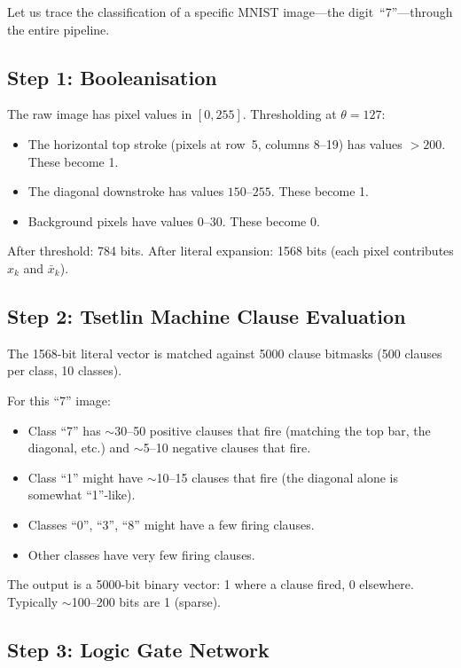 Let us trace the classification of a specific MNIST image---the
digit~``7''---through the entire pipeline.

\subsection{Step 1: Booleanisation}

The raw image has pixel values in $[0, 255]$. Thresholding at
$\theta = 127$:

\begin{itemize}
  \item The horizontal top stroke (pixels at row~5, columns 8--19)
    has values $> 200$. These become 1.
  \item The diagonal downstroke has values $150$--$255$. These
    become 1.
  \item Background pixels have values $0$--$30$. These become 0.
\end{itemize}

After threshold: 784 bits. After literal expansion: 1568 bits (each
pixel contributes $x_k$ and $\bar{x}_k$).

\subsection{Step 2: Tsetlin Machine Clause Evaluation}

The 1568-bit literal vector is matched against 5000 clause bitmasks
(500 clauses per class, 10 classes).

For this ``7'' image:
\begin{itemize}
  \item Class ``7'' has $\sim$30--50 positive clauses that fire
    (matching the top bar, the diagonal, etc.) and $\sim$5--10
    negative clauses that fire.
  \item Class ``1'' might have $\sim$10--15 clauses that fire
    (the diagonal alone is somewhat ``1''-like).
  \item Classes ``0'', ``3'', ``8'' might have a few firing clauses.
  \item Other classes have very few firing clauses.
\end{itemize}

The output is a 5000-bit binary vector: 1 where a clause fired, 0
elsewhere. Typically $\sim$100--200 bits are 1 (sparse).

\subsection{Step 3: Logic Gate Network}


